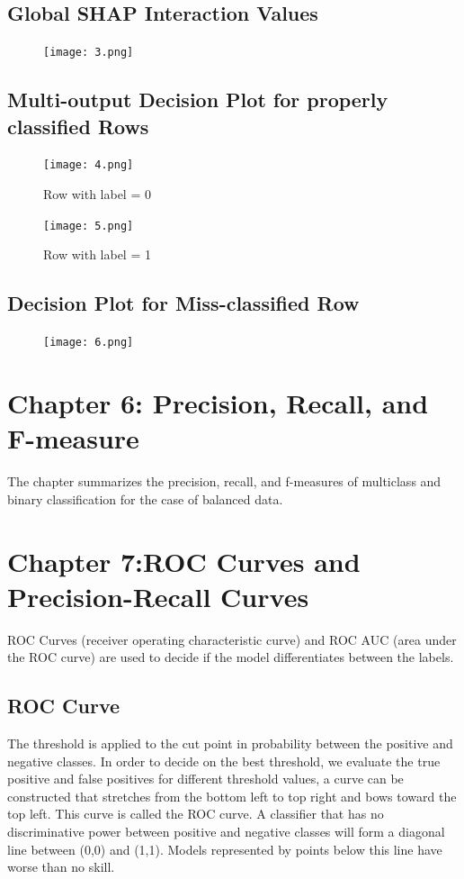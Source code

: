 \documentclass{article}
\begin{document}
\subsection{Global SHAP Interaction Values}
\begin{figure}[H]
\centering
\texttt{[image: 3.png]}
\end{figure}
\subsection{Multi-output Decision Plot for properly classified Rows}
\begin{figure}[H]
\centering
\texttt{[image: 4.png]}
\caption{Row with label = 0}
\end{figure}
\begin{figure}[H]
\centering
\texttt{[image: 5.png]}
\caption{Row with label = 1}
\end{figure}
\subsection{Decision Plot for Miss-classified Row}
\begin{figure}[H]
\centering
\texttt{[image: 6.png]}
\end{figure}

\section{Chapter 6: Precision, Recall, and F-measure}
The chapter summarizes the precision, recall, and f-measures of multiclass and binary classification for the case of balanced data.

\section{Chapter 7:ROC Curves and Precision-Recall
Curves}
ROC Curves (receiver operating characteristic curve) and ROC AUC (area under the ROC curve) are used to decide if the model differentiates between the labels. 
\subsection{ROC Curve}
The threshold is applied to the cut point in probability between the positive and negative classes. In order to decide on the best threshold, we evaluate the true positive and false positives for different threshold values, a curve can be constructed that stretches from the bottom left to top right and bows toward the top left. This curve is called the ROC curve. A classifier that has no discriminative power between positive and negative classes will form a diagonal line between (0,0) and (1,1). Models represented by points below this line have worse than no skill.
\end{document}
